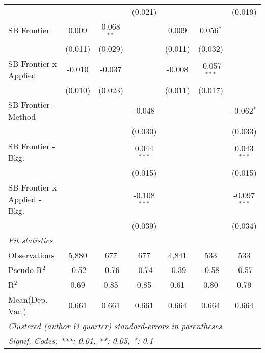 \begin{tabular}{lcccccc}
                                  &         &              & (0.021)        &         &                & (0.019)\\   
   SB Frontier                    & 0.009   & 0.068$^{**}$ &                & 0.009   & 0.056$^{*}$    &   \\   
                                  & (0.011) & (0.029)      &                & (0.011) & (0.032)        &   \\   
   SB Frontier x Applied          & -0.010  & -0.037       &                & -0.008  & -0.057$^{***}$ &   \\   
                                  & (0.010) & (0.023)      &                & (0.011) & (0.017)        &   \\   
   SB Frontier - Method           &         &              & -0.048         &         &                & -0.062$^{*}$\\   
                                  &         &              & (0.030)        &         &                & (0.033)\\   
   SB Frontier - Bkg.             &         &              & 0.044$^{***}$  &         &                & 0.043$^{***}$\\   
                                  &         &              & (0.015)        &         &                & (0.015)\\   
   SB Frontier x Applied - Bkg.   &         &              & -0.108$^{***}$ &         &                & -0.097$^{***}$\\   
                                  &         &              & (0.039)        &         &                & (0.034)\\   
   \midrule
   \emph{Fit statistics}\\
   Observations                   & 5,880   & 677          & 677            & 4,841   & 533            & 533\\  
   Pseudo R$^2$                   & -0.52   & -0.76        & -0.74          & -0.39   & -0.58          & -0.57\\  
   R$^2$                          & 0.69    & 0.85         & 0.85           & 0.61    & 0.80           & 0.79\\  
Mean(Dep. Var.) & 0.661 & 0.661 & 0.661 & 0.664 & 0.664 & 0.664 \\
   \midrule \midrule
   \multicolumn{7}{l}{\emph{Clustered (author \& quarter) standard-errors in parentheses}}\\
   \multicolumn{7}{l}{\emph{Signif. Codes: ***: 0.01, **: 0.05, *: 0.1}}\\
\end{tabular}
\par\endgroup
